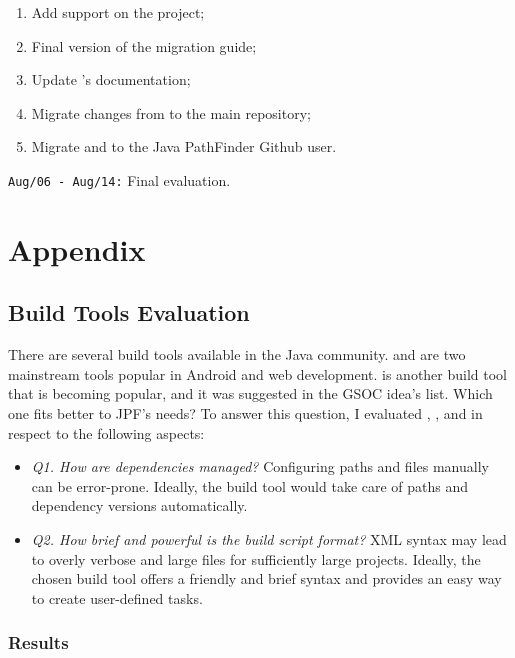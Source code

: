 \documentclass{article}
\begin{document}
\begin{enumerate}
\item Add \gradle{} support on the \jpftemplate{} project;
\item Final version of the migration guide;
\item Update \jpftemplate's documentation;
\item Migrate changes from \jpfcore{} to the main repository;
\item Migrate \jpfsymbc{} and \jpftemplate{} to the Java PathFinder Github user.
\end{enumerate}

\noindent\texttt{Aug/06 - Aug/14:} Final evaluation.

\clearpage
\appendix
\section{Appendix}
\subsection{Build Tools Evaluation}
\label{sec:eval}

There are several build tools available in the Java community.
\maven{} and \gradle{} are two mainstream tools popular in Android and web
development.
\sbt{}\cite{page:sbt} is another build tool that is becoming popular, and it
was suggested in the GSOC idea's list\cite{page:jpf-gsoc18}.
Which one fits better to JPF's needs?
To answer this question, I evaluated \maven{}, \gradle{}, and \sbt{} in respect
to the following aspects:

\begin{itemize}
\item \emph{Q1. How are dependencies managed?} Configuring paths and \jar{}
files manually can be error-prone. Ideally, the build tool would take care of
paths and dependency versions automatically.
\item \emph{Q2. How brief and powerful is the build script format?} XML syntax
may lead to overly verbose and large files for sufficiently large projects.
Ideally, the chosen build tool offers a friendly and brief syntax and provides
an easy way to create user-defined tasks.

\end{itemize}

\subsubsection*{Results}
\label{sec:results}
\end{document}
